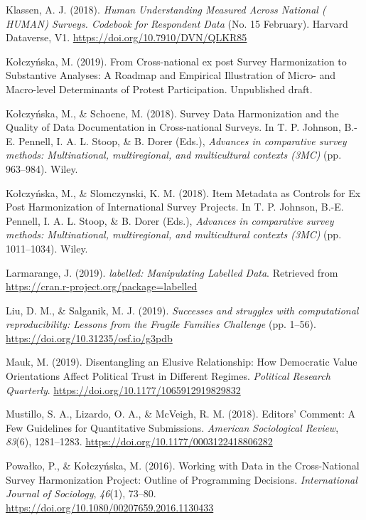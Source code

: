 \documentclass[12pt,]{article}
\begin{document}
\leavevmode\hypertarget{ref-Klassen2018}{}%
Klassen, A. J. (2018). \emph{Human Understanding Measured Across National ( HUMAN) Surveys. Codebook for Respondent Data} (No. 15 February). Harvard Dataverse, V1. \url{https://doi.org/10.7910/DVN/QLKR85}

\leavevmode\hypertarget{ref-Kolczynska2019}{}%
Kołczyńska, M. (2019). From Cross-national ex post Survey Harmonization to Substantive Analyses: A Roadmap and Empirical Illustration of Micro- and Macro-level Determinants of Protest Participation. Unpublished draft.

\leavevmode\hypertarget{ref-KolczynskaSchoene2018}{}%
Kołczyńska, M., \& Schoene, M. (2018). Survey Data Harmonization and the Quality of Data Documentation in Cross‐national Surveys. In T. P. Johnson, B.-E. Pennell, I. A. L. Stoop, \& B. Dorer (Eds.), \emph{Advances in comparative survey methods: Multinational, multiregional, and multicultural contexts (3MC)} (pp. 963--984). Wiley.

\leavevmode\hypertarget{ref-KolczynskaSlomczynski2018}{}%
Kołczyńska, M., \& Slomczynski, K. M. (2018). Item Metadata as Controls for Ex Post Harmonization of International Survey Projects. In T. P. Johnson, B.-E. Pennell, I. A. L. Stoop, \& B. Dorer (Eds.), \emph{Advances in comparative survey methods: Multinational, multiregional, and multicultural contexts (3MC)} (pp. 1011--1034). Wiley.

\leavevmode\hypertarget{ref-labelled}{}%
Larmarange, J. (2019). \emph{labelled: Manipulating Labelled Data}. Retrieved from \url{https://cran.r-project.org/package=labelled}

\leavevmode\hypertarget{ref-Liu2019}{}%
Liu, D. M., \& Salganik, M. J. (2019). \emph{Successes and struggles with computational reproducibility: Lessons from the Fragile Families Challenge} (pp. 1--56). \url{https://doi.org/10.31235/osf.io/g3pdb}

\leavevmode\hypertarget{ref-Mauk2019}{}%
Mauk, M. (2019). Disentangling an Elusive Relationship: How Democratic Value Orientations Affect Political Trust in Different Regimes. \emph{Political Research Quarterly}. \url{https://doi.org/10.1177/1065912919829832}

\leavevmode\hypertarget{ref-Mustillo2018}{}%
Mustillo, S. A., Lizardo, O. A., \& McVeigh, R. M. (2018). Editors' Comment: A Few Guidelines for Quantitative Submissions. \emph{American Sociological Review}, \emph{83}(6), 1281--1283. \url{https://doi.org/10.1177/0003122418806282}

\leavevmode\hypertarget{ref-Powako2016}{}%
Powałko, P., \& Kołczyńska, M. (2016). Working with Data in the Cross-National Survey Harmonization Project: Outline of Programming Decisions. \emph{International Journal of Sociology}, \emph{46}(1), 73--80. \url{https://doi.org/10.1080/00207659.2016.1130433}
\end{document}

